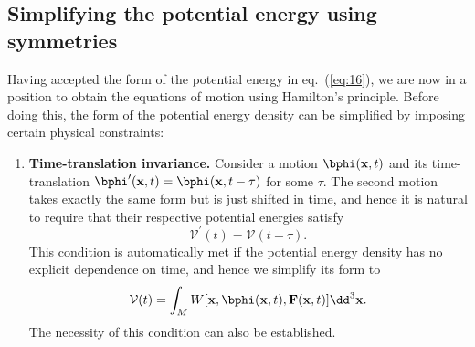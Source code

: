 \subsection*{Simplifying the potential energy using symmetries}
Having accepted the form of the potential energy in eq.~(\ref{eq:16}), we are now in a position to obtain the equations of 
motion using Hamilton's principle. Before doing this, the form of the potential energy density can 
be simplified by imposing certain physical constraints:

\begin{enumerate}
    \item[(i)] \textbf{Time-translation invariance.} Consider a motion $\bphi(\mathbf{x},t)$ and its time-translation 
    $\bphi^{\prime}(\mathbf{x},t)=\bphi(\mathbf{x},t-\tau)$ for some $\tau$. The second motion takes 
    exactly the same form but is just shifted in time, and hence it is natural to require that their respective 
    potential energies satisfy
    \begin{equation}
    \mathcal{V}^{\prime}(t)=\mathcal{V}(t-\tau).
    \label{eq:17}
    \end{equation}
    This condition is automatically met if the potential energy density has no explicit dependence on time, and hence we simplify its form to
    \begin{equation}
    \mathcal{V}(t)=\int_{M}W[\mathbf{x},\bphi(\mathbf{x},t),\mathbf{F}(\mathbf{x},t)]\dd^{3}\mathbf{x}.
    \label{eq:18}
    \end{equation}
    The necessity of this condition can also be established.


\end{enumerate}
